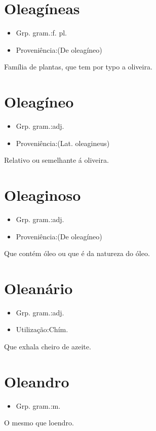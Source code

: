 \section{Oleagíneas}
\begin{itemize}
\item {Grp. gram.:f. pl.}
\end{itemize}
\begin{itemize}
\item {Proveniência:(De \textunderscore oleagíneo\textunderscore )}
\end{itemize}
Família de plantas, que tem por typo a oliveira.
\section{Oleagíneo}
\begin{itemize}
\item {Grp. gram.:adj.}
\end{itemize}
\begin{itemize}
\item {Proveniência:(Lat. \textunderscore oleagineus\textunderscore )}
\end{itemize}
Relativo ou semelhante á oliveira.
\section{Oleaginoso}
\begin{itemize}
\item {Grp. gram.:adj.}
\end{itemize}
\begin{itemize}
\item {Proveniência:(De \textunderscore oleagíneo\textunderscore )}
\end{itemize}
Que contém óleo ou que é da natureza do óleo.
\section{Oleanário}
\begin{itemize}
\item {Grp. gram.:adj.}
\end{itemize}
\begin{itemize}
\item {Utilização:Chím.}
\end{itemize}
Que exhala cheiro de azeite.
\section{Oleandro}
\begin{itemize}
\item {Grp. gram.:m.}
\end{itemize}
O mesmo que \textunderscore loendro\textunderscore .
